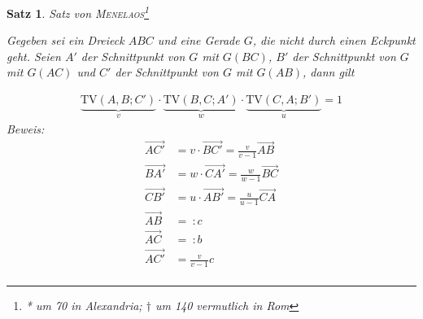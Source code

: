 \documentclass[%
a4paper,
10pt,           %
]
{scrartcl}
\newcommand{\TV}{\text{TV}}
\newcommand{\ora}{\overrightarrow}
\theoremstyle{plain}
\theoremstyle{plain}
\newtheorem{mysatz}[mydef]{Satz}
\theoremstyle{plain}
\theoremstyle{plain}
\theoremstyle{plain}
\begin{document}
\begin{mysatz}
    Satz von \textsc{Menelaos}\footnote{* um 70 in Alexandria; $\dagger$ um 140 vermutlich in Rom}

    \begin{minipage}{0.45\textwidth}
        Gegeben sei ein Dreieck $ABC$ und eine Gerade $G$, die nicht durch einen Eckpunkt geht. Seien $A'$ der Schnittpunkt von $G$ mit $G(BC)$, $B'$ der Schnittpunkt von $G$ mit $G(AC)$ und $C'$ der Schnittpunkt von $G$ mit $G(AB)$, dann gilt
    \end{minipage}
    \begin{minipage}{0.55\textwidth}
        \begin{center}
        \end{center}
    \end{minipage}
    \begin{align*}
        \underbrace{\TV(A,B;C')}_{v}
        \cdot
        \underbrace{\TV(B,C;A')}_{w}
        \cdot
        \underbrace{\TV(C,A;B')}_{u}
        = 1
    \end{align*}
    \textit{Beweis:}
    \begin{align*}
        \ora{AC'} & = v \cdot \ora{BC'} = \frac{v}{v-1} \ora{AB}\\
        \ora{BA'} & = w \cdot \ora{CA'} = \frac{w}{w-1} \ora{BC}\\
        \ora{CB'} & = u \cdot \ora{AB'} = \frac{u}{u-1} \ora{CA}\\
        \ora{AB} & =\ : c\\
        \ora{AC} & =\ : b\\
        \ora{AC'} & = \frac{v}{v-1} c\\

\end{align*}
\end{mysatz}
\end{document}
